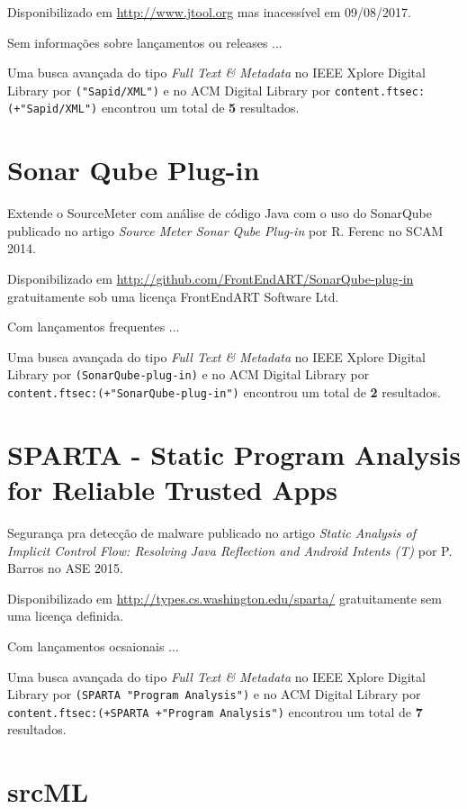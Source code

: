 Disponibilizado em \url{http://www.jtool.org}
mas inacessível em 09/08/2017.

Sem informações sobre lançamentos ou releases ...


Uma busca avançada do tipo {\it Full Text \& Metadata} no IEEE Xplore Digital Library por
\texttt{("Sapid/XML")}
e no ACM Digital Library por
\texttt{content.ftsec:(+"Sapid/XML")}
encontrou um total de
{\bf 5}
resultados.

\section{Sonar Qube Plug-in}

Extende o SourceMeter com análise de código Java com o uso do SonarQube
publicado no artigo {\it Source Meter Sonar Qube Plug-in}
por R. Ferenc
no SCAM 2014.

Disponibilizado em \url{http://github.com/FrontEndART/SonarQube-plug-in}
gratuitamente
sob uma licença FrontEndART Software Ltd.

Com lançamentos frequentes ...


Uma busca avançada do tipo {\it Full Text \& Metadata} no IEEE Xplore Digital Library por
\texttt{(SonarQube-plug-in)}
e no ACM Digital Library por
\texttt{content.ftsec:(+"SonarQube-plug-in")}
encontrou um total de
{\bf 2}
resultados.

\section{SPARTA - Static Program Analysis for Reliable Trusted Apps}

Segurança pra detecção de malware
publicado no artigo {\it Static Analysis of Implicit Control Flow: Resolving Java Reflection and Android Intents (T)}
por P. Barros
no ASE 2015.

Disponibilizado em \url{http://types.cs.washington.edu/sparta/}
gratuitamente
sem uma licença definida.

Com lançamentos ocsaionais ...


Uma busca avançada do tipo {\it Full Text \& Metadata} no IEEE Xplore Digital Library por
\texttt{(SPARTA "Program Analysis")}
e no ACM Digital Library por
\texttt{content.ftsec:(+SPARTA +"Program Analysis")}
encontrou um total de
{\bf 7}
resultados.

\section{srcML}

